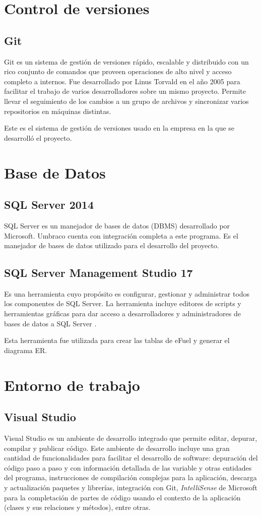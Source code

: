\section{Control de versiones}
\subsection{Git}
Git es un sistema de gestión de versiones rápido, escalable y distribuido con un rico conjunto de comandos que proveen operaciones de alto nivel y acceso completo a internos. \cite{gitGit} Fue desarrollado por Linus Torvald en el año 2005 para facilitar el trabajo de varios desarrolladores sobre un mismo proyecto. Permite llevar el seguimiento de los cambios a un grupo de archivos y sincronizar varios repositorios en máquinas distintas.

Este es el sistema de gestión de versiones usado en la empresa en la que se desarrolló el proyecto.

\section{Base de Datos}
\subsection{SQL Server 2014}
SQL Server es un manejador de bases de datos (DBMS) desarrollado por Microsoft. Umbraco cuenta con integración completa a este programa. Es el manejador de bases de datos utilizado para el desarrollo del proyecto.

\subsection{SQL Server Management Studio 17}
Es una herramienta cuyo propósito es configurar, gestionar y administrar todos los componentes de SQL Server. La herramienta incluye editores de scripts y herramientas gráficas para dar acceso a desarrolladores y administradores de bases de datos a SQL Server \cite{SSMSMicrosoft}.

Esta herramienta fue utilizada para crear las tablas de eFuel y generar el diagrama ER.

\section{Entorno de trabajo}
\subsection{Visual Studio}
Visual Studio es un ambiente de desarrollo integrado que permite editar, depurar, compilar y publicar código. \cite{visualStudioMicrosoft} Este ambiente de desarrollo incluye una gran cantidad de funcionalidades para facilitar el desarrollo de software: depuración del código paso a paso y con información detallada de las variable y otras entidades del programa, instrucciones de compilación complejas para la aplicación, descarga y actualización paquetes y librerías, integración con Git, \textit{IntelliSense} de Microsoft para la completación de partes de código usando el contexto de la aplicación (clases y sus relaciones y métodos), entre otras.

